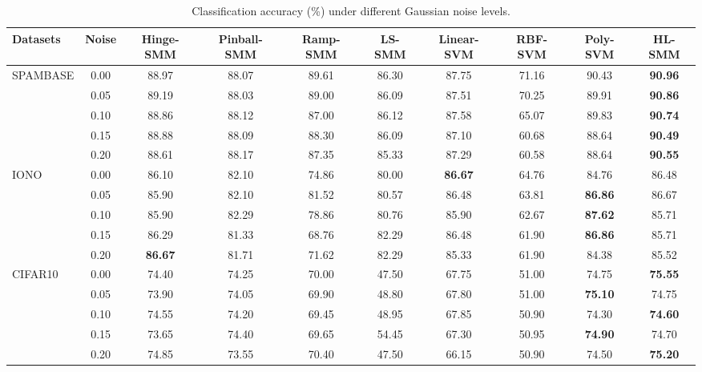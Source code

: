 \documentclass[sn-mathphys]{JORSC-jnl}%
\theoremstyle{thmstyleone}%
\theoremstyle{thmstylethree}%
\theoremstyle{thmstyleone} %
\begin{document}
\begin{table}[t]
\caption{Classification accuracy (\%) under different Gaussian noise levels.}
\label{table2}
\centering
\setlength{\tabcolsep}{3pt}  
\renewcommand{\arraystretch}{1.12}  
\small  

\begin{adjustbox}{width=\textwidth}
\begin{tabular}{lccccccccc}
\toprule  
Datasets & Noise
& Hinge-SMM
& Pinball-SMM
& Ramp-SMM
& LS-SMM
& Linear-SVM
& RBF-SVM
& Poly-SVM
& HL-SMM \\
\midrule 

\multirow{5}{*}{SPAMBASE}
& 0.00 & 88.97 & 88.07 & 89.61 & 86.30 & 87.75 & 71.16 & 90.43 & \textbf{90.96} \\
& 0.05 & 89.19 & 88.03 & 89.00 & 86.09 & 87.51 & 70.25 & 89.91 & \textbf{90.86} \\
& 0.10 & 88.86 & 88.12 & 87.00 & 86.12 & 87.58 & 65.07 & 89.83 & \textbf{90.74} \\
& 0.15 & 88.88 & 88.09 & 88.30 & 86.09 & 87.10 & 60.68 & 88.64 & \textbf{90.49} \\
& 0.20 & 88.61 & 88.17 & 87.35 & 85.33 & 87.29 & 60.58 & 88.64 & \textbf{90.55} \\
\midrule  

\multirow{5}{*}{IONO}
& 0.00 & 86.10 & 82.10 & 74.86 & 80.00 & \textbf{86.67} & 64.76 & 84.76 & 86.48 \\
& 0.05 & 85.90 & 82.10 & 81.52 & 80.57 & 86.48 & 63.81 & \textbf{86.86} & 86.67 \\
& 0.10 & 85.90 & 82.29 & 78.86 & 80.76 & 85.90 & 62.67 & \textbf{87.62} & 85.71 \\
& 0.15 & 86.29 & 81.33 & 68.76 & 82.29 & 86.48 & 61.90 & \textbf{86.86} & 85.71 \\
& 0.20 & \textbf{86.67} & 81.71 & 71.62 & 82.29 & 85.33 & 61.90 & 84.38 & 85.52 \\
\midrule  

\multirow{5}{*}{CIFAR10}
& 0.00 & 74.40 & 74.25 & 70.00 & 47.50 & 67.75 & 51.00 & 74.75 & \textbf{75.55} \\
& 0.05 & 73.90 & 74.05 & 69.90 & 48.80 & 67.80 & 51.00 & \textbf{75.10} & 74.75 \\
& 0.10 & 74.55 & 74.20 & 69.45 & 48.95 & 67.85 & 50.90 & 74.30 & \textbf{74.60} \\
& 0.15 & 73.65 & 74.40 & 69.65 & 54.45 & 67.30 & 50.95 & \textbf{74.90} & 74.70 \\
& 0.20 & 74.85 & 73.55 & 70.40 & 47.50 & 66.15 & 50.90 & 74.50 & \textbf{75.20} \\
\midrule  


\end{tabular}
\end{adjustbox}
\end{table}
\end{document}
